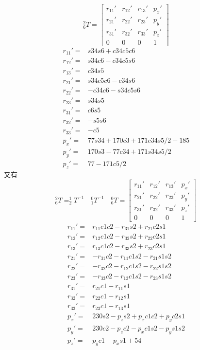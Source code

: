 \documentclass[12pt]{article}
\begin{document}
\[
    ^2_6T= \left[
        \begin{matrix}
            r_{11}' & r_{12}' & r_{13}' & p_x' \\
            r_{21}' & r_{22}' & r_{23}' & p_y' \\
            r_{31}' & r_{32}' & r_{33}' & p_z' \\
            0      & 0      & 0      & 1
        \end{matrix}  \right]
\]
\[
    \begin{aligned}
        r_{11}'=&s34s6+c34c5c6\\
        r_{12}'=&s34c6-c34c5s6\\
        r_{13}'=&c34s5\\ 
        r_{21}'=&s34c5c6-c34s6\\
        r_{22}'=&-c34c6-s34c5s6\\
        r_{23}'=&s34s5\\
        r_{31}'=&c6s5\\
        r_{32}'=&-s5s6\\
        r_{33}'=&-c5\\
        p_x'=&77s34+170c3+171c34s5/2+185\\
        p_y'=&170s3-77c34+171s34s5/2\\
        p_z'=&77-171c5/2
    \end{aligned}
\]  
又有
\[
    ^2_6T= ^1_2T^{-1}\quad ^0_1T^{-1}\quad ^0_6T= \left[
        \begin{matrix}
            r_{11}' & r_{12}' & r_{13}' & p_x' \\
            r_{21}' & r_{22}' & r_{23}' & p_y' \\
            r_{31}' & r_{32}' & r_{33}' & p_z' \\
            0      & 0      & 0      & 1
        \end{matrix}  \right]
\]
\[
    \begin{aligned}
        r_{11}'=&r_{11}c1c2-r_{31}s2+r_{21}c2s1\\
        r_{12}'=&r_{12}c1c2-r_{32}s2+r_{22}c2s1\\
        r_{13}'=&r_{13}c1c2-r_{33}s2+r_{23}c2s1\\ 
        r_{21}'=&-r_{31}c2-r_{11}c1s2-r_{21}s1s2\\
        r_{22}'=&-r_{32}c2-r_{12}c1s2-r_{22}s1s2\\
        r_{23}'=&-r_{33}c2-r_{13}c1s2-r_{23}s1s2\\
        r_{31}'=&r_{21}c1-r_{11}s1\\
        r_{32}'=&r_{22}c1-r_{12}s1\\
        r_{33}'=&r_{23}c1-r_{13}s1\\
        p_x'=&230s2-p_zs2+p_xc1c2+p_yc2s1\\
        p_y'=&230c2-p_zc2-p_xc1s2-p_ys1s2\\
        p_z'=&p_yc1-p_xs1+54
    \end{aligned}
\]  
\end{document}
